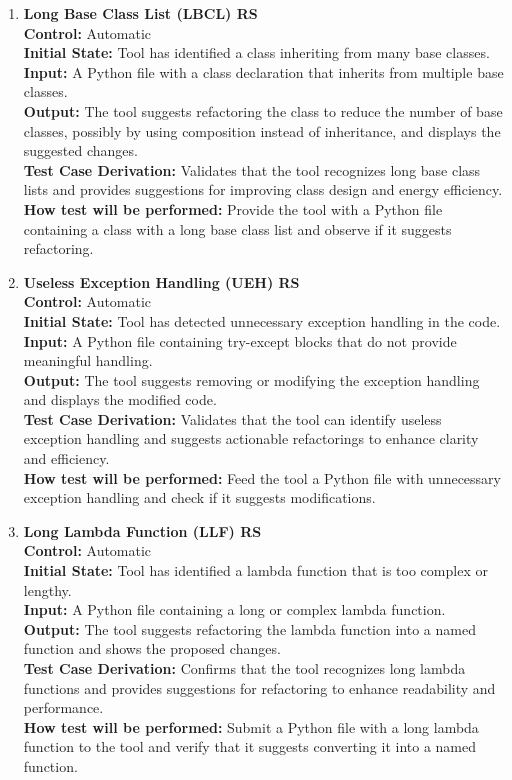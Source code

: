 \documentclass[12pt, titlepage]{article}
\begin{document}
\begin{enumerate}[label={\bf \textcolor{Maroon}{test-FR-RS-\arabic*}}, wide=0pt, font=\itshape]
  \item \textbf{Long Base Class List (LBCL) RS}\\[2mm]
    \textbf{Control:} Automatic \\
    \textbf{Initial State:} Tool has identified a class inheriting from many base classes.\\
    \textbf{Input:} A Python file with a class declaration that inherits from multiple base classes.\\
    \textbf{Output:} The tool suggests refactoring the class to reduce the number of base classes, possibly by using composition instead of inheritance, and displays the suggested changes.\\[2mm]
    \textbf{Test Case Derivation:} Validates that the tool recognizes long base class lists and provides suggestions for improving class design and energy efficiency.\\[2mm]
    \textbf{How test will be performed:} Provide the tool with a Python file containing a class with a long base class list and observe if it suggests refactoring.
  
  \item \textbf{Useless Exception Handling (UEH) RS}\\[2mm]
    \textbf{Control:} Automatic \\
    \textbf{Initial State:} Tool has detected unnecessary exception handling in the code.\\
    \textbf{Input:} A Python file containing try-except blocks that do not provide meaningful handling.\\
    \textbf{Output:} The tool suggests removing or modifying the exception handling and displays the modified code.\\[2mm]
    \textbf{Test Case Derivation:} Validates that the tool can identify useless exception handling and suggests actionable refactorings to enhance clarity and efficiency.\\[2mm]
    \textbf{How test will be performed:} Feed the tool a Python file with unnecessary exception handling and check if it suggests modifications.
  
  \item \textbf{Long Lambda Function (LLF) RS}\\[2mm]
    \textbf{Control:} Automatic \\
    \textbf{Initial State:} Tool has identified a lambda function that is too complex or lengthy.\\
    \textbf{Input:} A Python file containing a long or complex lambda function.\\
    \textbf{Output:} The tool suggests refactoring the lambda function into a named function and shows the proposed changes.\\[2mm]
    \textbf{Test Case Derivation:} Confirms that the tool recognizes long lambda functions and provides suggestions for refactoring to enhance readability and performance.\\[2mm]
    \textbf{How test will be performed:} Submit a Python file with a long lambda function to the tool and verify that it suggests converting it into a named function.
  

\end{enumerate}
\end{document}
